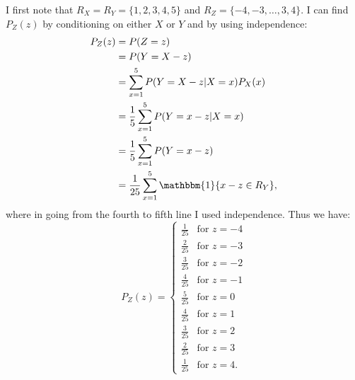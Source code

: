 \begin{problem}{12} I first note that $R_X=R_Y=\{1, 2, 3, 4, 5 \}$ and $R_Z=\{-4, -3, \ldots, 3, 4 \}$.  I can find $P_Z(z)$ by conditioning on either $X$ or $Y$ and by using independence:
\begin{align*}
P_Z(z) &= P(Z = z) \\
& = P(Y=X-z) \\
& = \sum_{x=1}^5 P(Y=X-z|X=x)P_X(x) \\
& = \frac{1}{5}\sum_{x=1}^5 P(Y=x-z|X=x) \\
& = \frac{1}{5}\sum_{x=1}^5 P(Y=x-z) \\
& = \frac{1}{25}\sum_{x=1}^5 \mathbbm{1}\{x-z\in R_Y \},
\end{align*}  
where in going from the fourth to fifth line I used independence.  Thus we have:
\[
  P_{Z}(z) =
  \begin{cases}
                                   \frac{1}{25} & \text{for $z=-4$} \\
                                    \frac{2}{25} & \text{for $z=-3$} \\
                                   \frac{3}{25} & \text{for $z=-2$} \\
                                   \frac{4}{25} & \text{for $z=-1$} \\
                                   \frac{5}{25} & \text{for $z=0$} \\
                                    \frac{4}{25} & \text{for $z=1$} \\
                                     \frac{3}{25} & \text{for $z=2$} \\
                                      \frac{2}{25} & \text{for $z=3$} \\
                                       \frac{1}{25} & \text{for $z=4$}.
   \end{cases}
\]


\end{problem}



